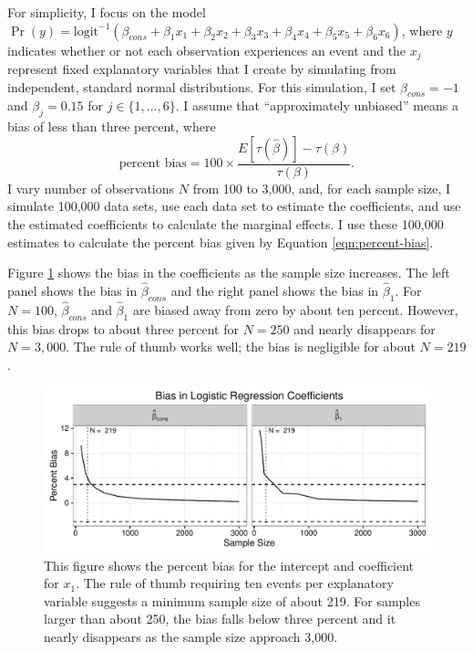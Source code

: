 \documentclass[12pt]{article}
\begin{document}
For simplicity, I focus on the model $\Pr (y) = \text{logit}^{-1}(\beta_{cons} + \beta_1x_1 + \beta_2x_2 + \beta_3x_3 + \beta_4x_4 + \beta_5x_5 + \beta_6x_6)$, where $y$ indicates whether or not each observation experiences an event and the $x_j$ represent fixed explanatory variables that I create by simulating from independent, standard normal distributions. 
For this simulation, I set $\beta_{cons} = -1$ and $\beta_j =  0.15$ for $j \in \{1, ..., 6\}$. 
I assume that ``approximately unbiased'' means a bias of less than three percent, where
\begin{equation}\label{eqn:percent-bias}
\text{percent bias} = 100 \times \frac{E[\tau(\hat{\beta})] - \tau(\beta)}{\tau(\beta)}\text{.}
\end{equation}
I vary number of observations $N$ from 100 to 3,000, and, for each sample size, I simulate 100,000 data sets, use each data set to estimate the coefficients, and use the estimated coefficients to calculate the marginal effects.
I use these 100,000 estimates to calculate the percent bias given by Equation \ref{eqn:percent-bias}.

Figure \ref{fig:bias-coef} shows the bias in the coefficients as the sample size increases. The left panel shows the bias in $\hat{\beta}_{cons}$ and the right panel shows the bias in $\hat{\beta}_1$. 
For $N = 100$, $\hat{\beta}_{cons}$ and $\hat{\beta}_1$ are biased away from zero by about ten percent. 
However, this bias drops to about three percent for $N = 250$ and nearly disappears for $N = 3,000$. 
The rule of thumb works well; the bias is negligible for about $N = 219$.

\begin{figure}[h!]
\begin{center}
\includegraphics[scale = 0.7]{figs/bias-coef.pdf}
\caption{This figure shows the percent bias for the intercept and coefficient for $x_1$. 
The rule of thumb requiring ten events per explanatory variable suggests a minimum sample size of about 219. 
For samples larger than about 250, the bias falls below three percent and it nearly disappears as the sample size approach 3,000.}\label{fig:bias-coef}
\end{center}
\end{figure}
\end{document}
